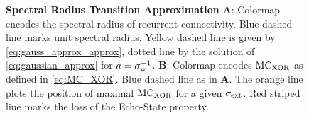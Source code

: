 \documentclass[a4paper,12pt]{article}
\begin{document}
\begin{figure}[t!]
\begin{minipage}[t]{0.42\textwidth}
	\end{minipage}
	\caption{{\bf Spectral Radius Transition Approximation} {\bf A}: Colormap encodes the spectral radius of recurrent connectivity. Blue dashed line marks unit spectral radius. Yellow dashed line is given by \eqref{eq:gauss_approx_approx}, dotted line by the solution of \eqref{eq:gaussian_approx} for $a=\sigma_{\rm w}^{-1}$. {\bf B}: Colormap encodes $\mathrm{MC}_{\rm XOR}$ as defined in \eqref{eq:MC_XOR}. Blue dashed line as in {\bf A}. The orange line plots the position of maximal $\mathrm{MC}_{\rm XOR}$ for a given $\sigma_{\rm ext}$. Red striped line marks the loss of the Echo-State property.}
	\label{Fig:theory_simulation_2}
\end{figure}



\vspace{-.35cm}

\end{document}
